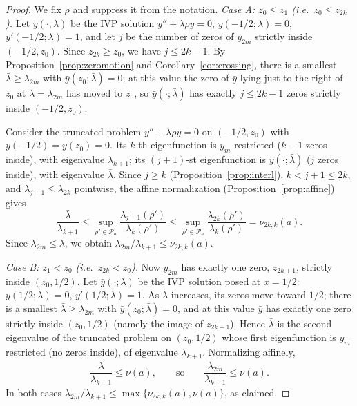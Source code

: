 ﻿\documentclass[11pt]{article}
\begin{document}
\begin{proof}
	We fix $\rho$ and suppress it from the notation.
	\emph{Case A: $z_0\le z_1$ (i.e.\ $z_0\le z_{2k}$).}
	Let $\bar y(\cdot;\lambda)$ be the IVP solution
	$y''+\lambda\rho y=0$, $y(-1/2;\lambda)=0$, $y'(-1/2;\lambda)=1$, and let
	$j$ be the number of zeros of $y_{2m}$ strictly inside $(-1/2,z_0)$.
	Since $z_{2k}\ge z_0$, we have $j\le 2k-1$.  By
	Proposition~\ref{prop:zeromotion} and Corollary~\ref{cor:crossing},
	there is a smallest $\bar\lambda\ge\lambda_{2m}$ with
	$\bar y(z_0;\bar\lambda)=0$; at this value the zero of $\bar y$ lying
	just to the right of $z_0$ at $\lambda=\lambda_{2m}$ has moved to $z_0$,
	so $\bar y(\cdot;\bar\lambda)$ has exactly $j\le 2k-1$ zeros strictly
	inside $(-1/2,z_0)$.

	Consider the truncated problem
	$y''+\lambda\rho y=0$ on $(-1/2,z_0)$ with
	$y(-1/2)=y(z_0)=0$.  Its $k$-th eigenfunction is $y_m$ restricted
	($k-1$ zeros inside), with eigenvalue $\lambda_{k+1}$; its
	$(j+1)$-st eigenfunction is $\bar y(\cdot;\bar\lambda)$ ($j$ zeros
	inside), with eigenvalue $\bar\lambda$.  Since $j\ge k$
	(Proposition~\ref{prop:interl}), $k<j+1\le 2k$, and
	$\lambda_{j+1}\le\lambda_{2k}$ pointwise, the affine
	normalization (Proposition~\ref{prop:affine}) gives
	\begin{equation*}
		\frac{\bar\lambda}{\lambda_{k+1}}
		\le\sup_{\rho'\in\mathcal P_a}\frac{\lambda_{j+1}(\rho')}
		{\lambda_k(\rho')}
		\le\sup_{\rho'\in\mathcal P_a}\frac{\lambda_{2k}(\rho')}
		{\lambda_k(\rho')}
		=\nu_{2k,k}(a).
	\end{equation*}
	Since $\lambda_{2m}\le\bar\lambda$, we obtain
	$\lambda_{2m}/\lambda_{k+1}\le\nu_{2k,k}(a)$.

	\emph{Case B: $z_1<z_0$ (i.e.\ $z_{2k}<z_0$).}
	Now $y_{2m}$ has exactly one zero, $z_{2k+1}$, strictly inside
	$(z_0,1/2)$.  Let $\bar y(\cdot;\lambda)$ be the IVP solution posed at
	$x=1/2$: $y(1/2;\lambda)=0$, $y'(1/2;\lambda)=1$.  As $\lambda$
	increases, its zeros move toward $1/2$; there is a smallest
	$\bar\lambda\ge\lambda_{2m}$ with $\bar y(z_0;\bar\lambda)=0$, and at
	this value $\bar y$ has exactly one zero strictly inside $(z_0,1/2)$
	(namely the image of $z_{2k+1}$).  Hence $\bar\lambda$ is the second
	eigenvalue of the truncated problem on $(z_0,1/2)$ whose first
	eigenfunction is $y_m$ restricted (no zeros inside), of eigenvalue
	$\lambda_{k+1}$.  Normalizing affinely,
	\begin{equation*}
		\frac{\bar\lambda}{\lambda_{k+1}}\le\nu(a),
		\qquad\text{so}\qquad
		\frac{\lambda_{2m}}{\lambda_{k+1}}\le\nu(a).
	\end{equation*}
	In both cases $\lambda_{2m}/\lambda_{k+1}\le
	\max\{\nu_{2k,k}(a),\nu(a)\}$, as claimed.
\end{proof}
\end{document}
